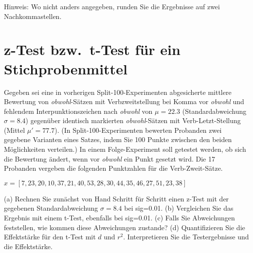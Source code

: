 \begin{center}
  Hinweis: Wo nicht anders angegeben, runden Sie die Ergebnisse auf zwei Nachkommastellen.
\end{center}

\section{z-Test bzw.\ t-Test für ein Stichprobenmittel}\label{sec:zt}

Gegeben sei eine in vorherigen Split-100-Experimenten abgesicherte mittlere Bewertung von \textit{obwohl}-Sätzen mit Verbzweitstellung bei Komma vor \textit{obwohl} und fehlendem Interpunktionszeichen nach \textit{obwohl} von $\mu=22.3$ (Standardabweichung $\sigma=8.4$) gegenüber identisch markierten \textit{obwohl}-Sätzen mit Verb-Letzt-Stellung (Mittel $\mu\prime=77.7$).
(In Split-100-Experimenten bewerten Probanden zwei gegebene Varianten eines Satzes, indem Sie 100 Punkte zwischen den beiden Möglichkeiten verteilen.)
In einem Folge-Experiment soll getestet werden, ob sich die Bewertung ändert, wenn vor \textit{obwohl} ein Punkt gesetzt wird.
Die 17 Probanden vergeben die folgenden Punktzahlen für die Verb-Zweit-Sätze.

\begin{center}
  \begin{math}
    x = [7, 23, 20, 10, 37, 21, 40, 53, 28, 30, 44, 35, 46, 27, 51, 23, 38]
  \end{math}
\end{center}

(a) Rechnen Sie zunächst von Hand Schritt für Schritt einen z-Test mit der gegebenen Standardabweichung $\sigma=8.4$ bei sig=0.01.
(b) Vergleichen Sie das Ergebnis mit einem t-Test, ebenfalls bei sig=0.01.
(c) Falls Sie Abweichungen feststellen, wie kommen diese Abweichungen zustande?
(d) Quantifizieren Sie die Effektstärke für den t-Test mit $d$ und $r^2$.
Interpretieren Sie die Testergebnisse und die Effektstärke.\\


